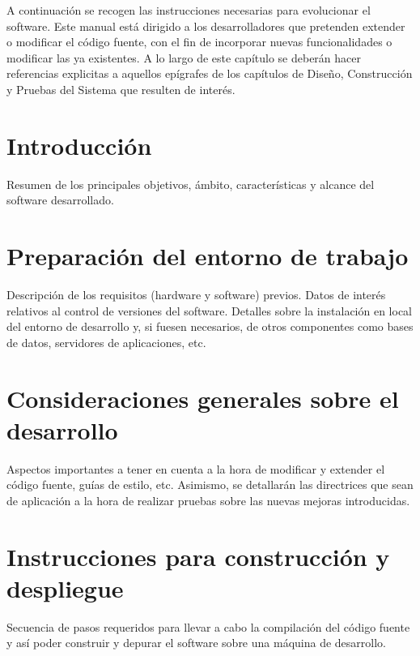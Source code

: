 

A continuación se recogen las instrucciones necesarias para evolucionar el software. Este manual está dirigido a los desarrolladores que pretenden extender o modificar el código fuente, con el fin de incorporar nuevas funcionalidades o modificar las ya existentes. A lo largo de este capítulo se deberán hacer referencias explicitas a aquellos epígrafes de los capítulos de Diseño, Construcción y Pruebas del Sistema que resulten de interés.

\section{Introducción}
Resumen de los principales objetivos, ámbito, características y alcance del software desarrollado.

\section{Preparación del entorno de trabajo}
Descripción de los requisitos (hardware y software) previos. Datos de interés relativos al control de versiones del software. Detalles sobre la instalación en local del entorno de desarrollo y, si fuesen necesarios, de otros componentes como bases de datos, servidores de aplicaciones, etc. 

\section{Consideraciones generales sobre el desarrollo}
Aspectos importantes a tener en cuenta a la hora de modificar y extender el código fuente, guías de estilo, etc. Asimismo, se detallarán las directrices que sean de aplicación a la hora de realizar pruebas sobre las nuevas mejoras introducidas.

\section{Instrucciones para construcción y despliegue}
Secuencia de pasos requeridos para llevar a cabo la compilación del código fuente y así poder construir y depurar el software sobre una máquina de desarrollo.
